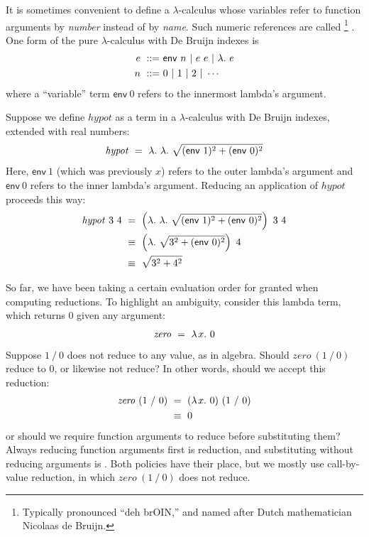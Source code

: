 It is sometimes convenient to define a $\lambda$-calculus whose variables refer to function arguments by \emph{number} instead of by \emph{name}.
Such numeric references are called \footnote{Typically pronounced ``deh brOIN,'' and named after Dutch mathematician Nicolaas de Bruijn.} .
One form of the pure $\lambda$-calculus with De Bruijn indexes is
\begin{equation}
\begin{aligned}
	e\ ::=&\ \mathsf{env}~n\ |\ e~e\ |\ \lambda\ldotp\, e \\
	n\ ::=&\ 0\ |\ 1\ |\ 2\ |\ \cdots
\end{aligned}
\end{equation}
where a ``variable'' term $\mathsf{env}~0$ refers to the innermost lambda's argument.

Suppose we define $\mathit{hypot}$ as a term in a $\lambda$-calculus with De Bruijn indexes, extended with real numbers:
\begin{equation}
	\mathit{hypot}\ =\ \lfun\lfun\sqrt{(\mathsf{env}~1)^2 + (\mathsf{env}~0)^2}
\end{equation}
Here, $\mathsf{env}~1$ (which was previously $x$) refers to the outer lambda's argument and $\mathsf{env}~0$ refers to the inner lambda's argument.
Reducing an application of $\mathit{hypot}$ proceeds this way:
\begin{equation}
\begin{aligned}
	\mathit{hypot}~3~4
		&\ =\ \left(\lambda\ldotp\,\lambda\ldotp\, \sqrt{(\mathsf{env}~1)^2 + (\mathsf{env}~0)^2}\right)~3~4 \\
		&\ \equiv\ \left(\lambda\ldotp\, \sqrt{3^2 + (\mathsf{env}~0)^2}\right)~4 \\
		&\ \equiv\ \sqrt{3^2 + 4^2} \\
\end{aligned}
\label{eqn:lambda-calculus-reduce2}
\end{equation}

So far, we have been taking a certain evaluation order for granted when computing reductions.
To highlight an ambiguity, consider this lambda term, which returns $0$ given any argument:
\begin{equation}
	\mathit{zero}\ =\ \fun{x} 0
\end{equation}
Suppose $1~{/}~0$ does not reduce to any value, as in algebra.
Should $\mathit{zero}~(1~{/}~0)$ reduce to $0$, or likewise not reduce?
In other words, should we accept this reduction:
\begin{equation}
\begin{aligned}
	\mathit{zero}~(1~{/}~0)
	&\ =\ (\lambda\mspace{2mu}{x}\ldotp\, 0)~(1~{/}~0)
\\
	&\ \equiv\ 0
\end{aligned}
\end{equation}
or should we require function arguments to reduce before substituting them?
Always reducing function arguments first is  reduction, and substituting without reducing arguments is .
Both policies have their place, but we mostly use call-by-value reduction, in which $\mathit{zero}~(1~{/}~0)$ does not reduce.

